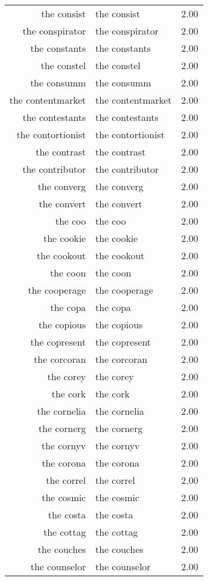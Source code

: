 \begin{table}[ht]
\begin{tabular}{rlr}
  the consist & the consist & 2.00 \\ 
  the conspirator & the conspirator & 2.00 \\ 
  the constants & the constants & 2.00 \\ 
  the constel & the constel & 2.00 \\ 
  the consumm & the consumm & 2.00 \\ 
  the contentmarket & the contentmarket & 2.00 \\ 
  the contestants & the contestants & 2.00 \\ 
  the contortionist & the contortionist & 2.00 \\ 
  the contrast & the contrast & 2.00 \\ 
  the contributor & the contributor & 2.00 \\ 
  the converg & the converg & 2.00 \\ 
  the convert & the convert & 2.00 \\ 
  the coo & the coo & 2.00 \\ 
  the cookie & the cookie & 2.00 \\ 
  the cookout & the cookout & 2.00 \\ 
  the coon & the coon & 2.00 \\ 
  the cooperage & the cooperage & 2.00 \\ 
  the copa & the copa & 2.00 \\ 
  the copious & the copious & 2.00 \\ 
  the copresent & the copresent & 2.00 \\ 
  the corcoran & the corcoran & 2.00 \\ 
  the corey & the corey & 2.00 \\ 
  the cork & the cork & 2.00 \\ 
  the cornelia & the cornelia & 2.00 \\ 
  the cornerg & the cornerg & 2.00 \\ 
  the cornyv & the cornyv & 2.00 \\ 
  the corona & the corona & 2.00 \\ 
  the correl & the correl & 2.00 \\ 
  the cosmic & the cosmic & 2.00 \\ 
  the costa & the costa & 2.00 \\ 
  the cottag & the cottag & 2.00 \\ 
  the couches & the couches & 2.00 \\ 
  the counselor & the counselor & 2.00 \\ 

\end{tabular}
\end{table}
